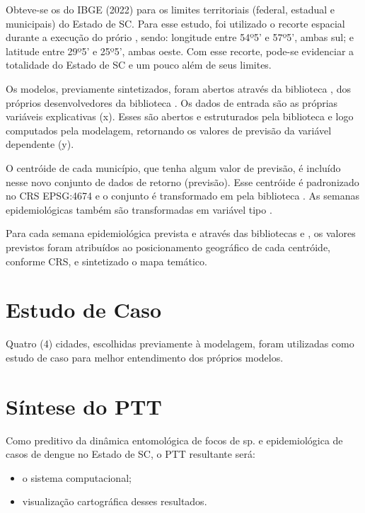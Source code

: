 \indent Obteve-se os  do \acrshort{IBGE} (2022) para os limites territoriais (federal, estadual e municipais) do Estado de \acrlong{SC}. Para esse estudo, foi utilizado o recorte espacial durante a execução do prório , sendo: longitude entre 54º5' e 57º5', ambas sul; e latitude entre 29º5' e 25º5', ambas oeste. Com esse recorte, pode-se evidenciar a totalidade do Estado de \acrlong{SC} e um pouco além de seus limites.

\indent Os modelos, previamente sintetizados, foram abertos através da biblioteca , dos próprios desenvolvedores da biblioteca . Os dados de entrada são as próprias variáveis explicativas (x). Esses são abertos e estruturados pela biblioteca  e logo computados pela modelagem, retornando os valores de previsão da variável dependente (y).

\indent O centróide de cada município, que tenha algum valor de previsão, é incluído nesse novo conjunto de dados de retorno (previsão). Esse centróide é padronizado no CRS EPSG:4674 e o conjunto é transformado em  pela biblioteca . As semanas epidemiológicas também são transformadas em variável tipo .

\indent Para cada semana epidemiológica prevista e através das bibliotecas  e , os valores previstos foram atribuídos ao posicionamento geográfico de cada centróide, conforme CRS, e sintetizado o mapa temático.
 
\section{Estudo de Caso}

\indent Quatro (4) cidades, escolhidas previamente à modelagem, foram utilizadas como estudo de caso para melhor entendimento dos próprios modelos.

\section{Síntese do \acrfull{PTT}} 

\indent Como preditivo da dinâmica entomológica de focos de  sp. e epidemiológica de casos de dengue no Estado de \acrlong{SC}, o \acrshort{PTT} resultante será:

\begin{itemize}
  \item o sistema computacional;
  \item visualização cartográfica desses resultados.
\end{itemize}

